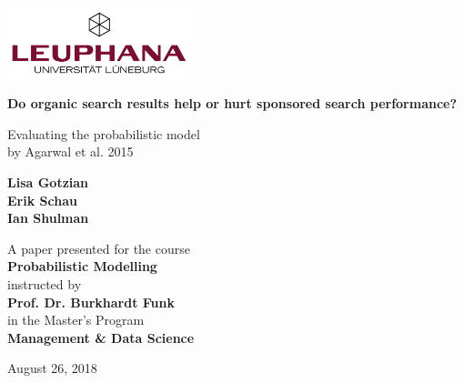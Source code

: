 \begin{titlepage}
    \begin{center}
        \includegraphics[width=0.4\textwidth]{leuphanalogo}       
        \vspace*{1cm}
        
        \huge
        \textbf{Do organic search results help or
hurt sponsored search
performance?}
        
        \vspace{0.5cm}
        \LARGE
        Evaluating the probabilistic model \\ by Agarwal et al. 2015
        
        \vspace{1.5cm}
        \large
        \textbf{Lisa Gotzian}\\
        \textbf{Erik Schau}\\
        \textbf{Ian Shulman}
        
        \vfill
        \large
        A paper presented for the course \\
        \textbf{Probabilistic Modelling}\\
        instructed by\\
        \textbf{Prof. Dr. Burkhardt Funk}\\
        in the Master's Program\\
        \textbf{Management \& Data Science}
        
        \vspace{0.8cm}
        
        August 26, 2018
        
    \end{center}
\end{titlepage}